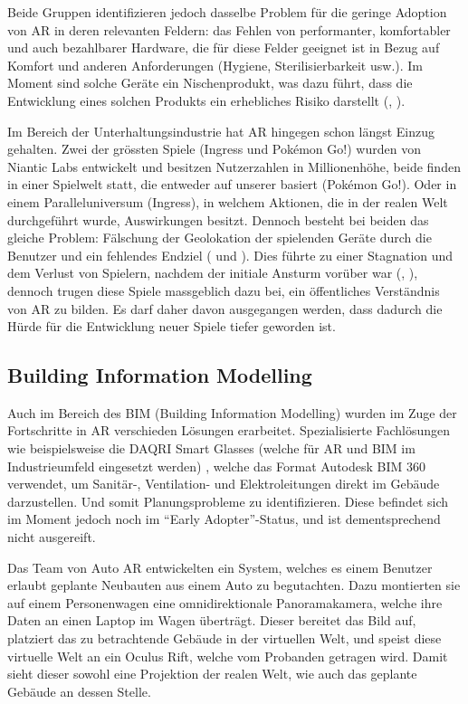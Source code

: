 \documentclass[a4paper]{scrreprt}
\begin{document}
Beide Gruppen identifizieren jedoch dasselbe Problem für die geringe Adoption von AR in deren relevanten Feldern: das Fehlen von performanter, komfortabler und auch bezahlbarer Hardware, die für diese Felder geeignet ist in Bezug auf Komfort und anderen Anforderungen (Hygiene, Sterilisierbarkeit usw.). Im Moment sind solche Geräte ein Nischenprodukt, was dazu führt, dass die Entwicklung eines solchen Produkts ein erhebliches Risiko darstellt (\cite{Piroozfar2018}, \cite{Pelargos2017}).

Im Bereich der Unterhaltungsindustrie hat AR hingegen schon längst Einzug gehalten. Zwei der grössten Spiele (Ingress und Pokémon Go!) wurden von Niantic Labs entwickelt und besitzen Nutzerzahlen in Millionenhöhe, beide finden in einer Spielwelt statt, die entweder auf unserer basiert (Pokémon Go!). Oder in einem Paralleluniversum (Ingress), in welchem Aktionen, die in der realen Welt durchgeführt wurde, Auswirkungen besitzt. Dennoch besteht bei beiden das gleiche Problem: Fälschung der Geolokation der spielenden Geräte durch die Benutzer und ein fehlendes Endziel (\cite{MRRX2015} und \cite{KamelBoulos2017}). Dies führte zu einer Stagnation und dem Verlust von Spielern, nachdem der initiale Ansturm vorüber war (\cite{Arif2017}, \cite{KamelBoulos2017}), dennoch trugen diese Spiele massgeblich dazu bei, ein öffentliches Verständnis von AR zu bilden. Es darf daher davon ausgegangen werden, dass dadurch die Hürde für die Entwicklung neuer Spiele tiefer geworden ist.

\subsection{Building Information Modelling}

Auch im Bereich des BIM (Building Information Modelling) wurden im Zuge der Fortschritte in AR verschieden Lösungen erarbeitet. Spezialisierte Fachlösungen wie beispielsweise die DAQRI Smart Glasses (welche für AR und BIM im Industrieumfeld eingesetzt werden) \parencite{DAQRI2018}, welche das Format Autodesk BIM 360 verwendet, um Sanitär-, Ventilation- und Elektroleitungen direkt im Gebäude darzustellen. Und somit Planungsprobleme zu identifizieren. Diese befindet sich im Moment jedoch noch im \textquotedblleft Early Adopter\textquotedblright-Status, und ist dementsprechend nicht ausgereift.

Das Team von Auto AR \parencite{Opperman2015} entwickelten ein System, welches es einem Benutzer erlaubt geplante Neubauten aus einem Auto zu begutachten. Dazu montierten sie auf einem Personenwagen eine omnidirektionale Panoramakamera, welche ihre Daten an einen Laptop im Wagen überträgt. Dieser bereitet das Bild auf, platziert das zu betrachtende Gebäude in der virtuellen Welt, und speist diese virtuelle Welt an ein Oculus Rift, welche vom Probanden getragen wird. Damit sieht dieser sowohl eine Projektion der realen Welt, wie auch das geplante Gebäude an dessen Stelle.
\end{document}
